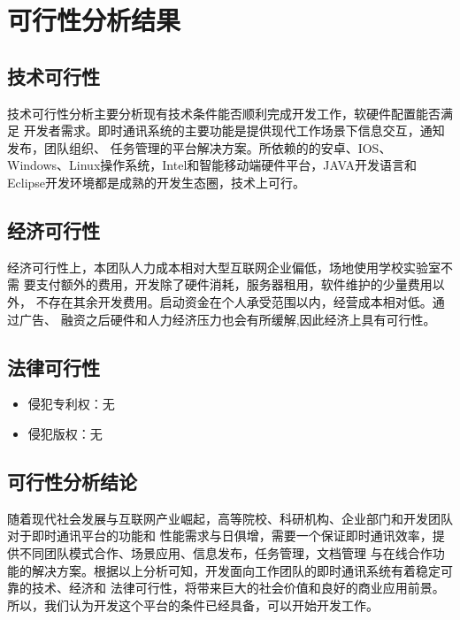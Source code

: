 \chapter{可行性分析结果}
\section{技术可行性}
    技术可行性分析主要分析现有技术条件能否顺利完成开发工作，软硬件配置能否满足
    开发者需求。即时通讯系统的主要功能是提供现代工作场景下信息交互，通知发布，团队组织、
    任务管理的平台解决方案。所依赖的的安卓、IOS、Windows、Linux操作系统，Intel和智能移动端硬件平台，JAVA开发语言和
    Eclipse开发环境都是成熟的开发生态圈，技术上可行。
\section{经济可行性}
    经济可行性上，本团队人力成本相对大型互联网企业偏低，场地使用学校实验室不需
    要支付额外的费用，开发除了硬件消耗，服务器租用，软件维护的少量费用以外，
    不存在其余开发费用。启动资金在个人承受范围以内，经营成本相对低。通过广告、
    融资之后硬件和人力经济压力也会有所缓解,因此经济上具有可行性。
\section{法律可行性}
\begin{itemize}
    \item 侵犯专利权：无
    \item 侵犯版权：无
\end{itemize}
\section{可行性分析结论}
    随着现代社会发展与互联网产业崛起，高等院校、科研机构、企业部门和开发团队对于即时通讯平台的功能和
    性能需求与日俱增，需要一个保证即时通讯效率，提供不同团队模式合作、场景应用、信息发布，任务管理，文档管理
    与在线合作功能的解决方案。根据以上分析可知，开发面向工作团队的即时通讯系统有着稳定可靠的技术、经济和
    法律可行性，将带来巨大的社会价值和良好的商业应用前景。所以，我们认为开发这个平台的条件已经具备，可以开始开发工作。
